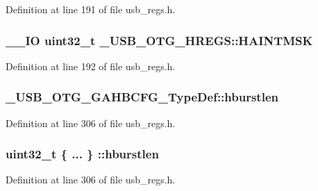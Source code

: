 Definition at line 191 of file usb\-\_\-regs.\-h.

\hypertarget{group___u_s_b___o_t_g___d_r_i_v_e_r_gafa6f6d9cc7d7eec8c6ce03f807d0f89a}{
\subsubsection[{H\-A\-I\-N\-T\-M\-S\-K}]{\setlength{\rightskip}{0pt plus 5cm}\-\_\-\-\_\-\-I\-O {\bf uint32\-\_\-t} \-\_\-\-U\-S\-B\-\_\-\-O\-T\-G\-\_\-\-H\-R\-E\-G\-S\-::\-H\-A\-I\-N\-T\-M\-S\-K}}\label{group___u_s_b___o_t_g___d_r_i_v_e_r_gafa6f6d9cc7d7eec8c6ce03f807d0f89a}


Definition at line 192 of file usb\-\_\-regs.\-h.

\hypertarget{group___u_s_b___o_t_g___d_r_i_v_e_r_gaef76ba04426956f90a8f6f25dd493051}{
\subsubsection[{hburstlen}]{ \-\_\-\-U\-S\-B\-\_\-\-O\-T\-G\-\_\-\-G\-A\-H\-B\-C\-F\-G\-\_\-\-Type\-Def\-::hburstlen}}\label{group___u_s_b___o_t_g___d_r_i_v_e_r_gaef76ba04426956f90a8f6f25dd493051}


Definition at line 306 of file usb\-\_\-regs.\-h.

\hypertarget{group___u_s_b___o_t_g___d_r_i_v_e_r_ga1f0fd4f95b47e056e6a55952e0178e55}{
\subsubsection[{hburstlen}]{\setlength{\rightskip}{0pt plus 5cm}uint32\-\_\-t \{ ... \} \-::hburstlen}}\label{group___u_s_b___o_t_g___d_r_i_v_e_r_ga1f0fd4f95b47e056e6a55952e0178e55}


Definition at line 306 of file usb\-\_\-regs.\-h.

